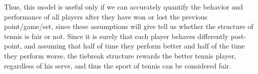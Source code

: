 \documentclass[12pt]{article}
\begin{document}
Thus, this model is useful only if we can accurately quantify the behavior and performance of all players after they have won or lost the previous point/game/set, since these assumptions will give tell us whether the structure of tennis is fair or not. Since it is surely that each player behaves differently post-point, and assuming that half of time they perform better and half of the time they perform worse, the tiebreak structure rewards the better tennis player, regardless of his serve, and thus the sport of tennis can be considered fair. 
\end{document}
